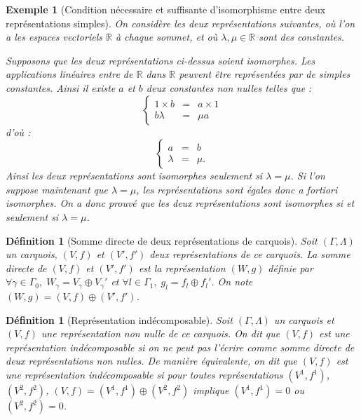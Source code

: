 \documentclass[a4paper,11pt]{article}
\newtheorem{defi}[thm]{Définition}%
\newtheorem{ex}[thm]{Exemple}%
\begin{document}
\begin{ex}[Condition nécessaire et suffisante d'isomorphisme entre deux représentations simples] On considère les deux représentations suivantes, où l'on a les espaces vectoriels $\mathbb R$ à chaque sommet, et où $\lambda,\mu\in\mathbb R$ sont des constantes. 
\label{cnsiso}

\begin{center}
	\end{center}
Supposons que les deux représentations ci-dessus soient isomorphes. Les applications linéaires entre de $\mathbb R$ dans $\mathbb R$ peuvent être représentées par de simples constantes. Ainsi il existe $a$ et $b$ deux constantes non nulles telles que :
\[
\left\{
\begin{array}{ccc}
	1\times b&=&a\times1\\
	b\lambda&=&\mu a 
\end{array}
\right.
\]
d'où :
\[
\left\{
\begin{array}{ccc}
	a&=&b\\
	\lambda&=&\mu. 
\end{array}
\right.
\]
Ainsi les deux représentations sont isomorphes seulement si $\lambda=\mu$. Si l'on suppose maintenant que $\lambda=\mu$, les représentations sont égales donc a fortiori isomorphes. On a donc prouvé que les deux représentations sont isomorphes si et seulement si $\lambda=\mu$.
\end{ex}
\begin{defi}[Somme directe de deux représentations de carquois]
	Soit $(\Gamma,\Lambda)$ un carquois, $(V,f)$ et $(V',f')$ deux représentations de ce carquois. La \emph{somme directe} de $(V,f)$ et $(V',f')$ est la représentation $(W,g)$ définie par $\forall\gamma\in\Gamma_{0},\;W_{\gamma}=V_{\gamma}\oplus V_{\gamma}'$ et $\forall l \in\Gamma_{1},\;g_{l}=f_{l}\oplus f_{l}'$. On note $(W,g)=(V,f)\oplus (V',f')$.
\end{defi}
\begin{defi}[Représentation indécomposable]
	Soit $(\Gamma,\Lambda)$ un carquois et $(V,f)$ une représentation non nulle de ce carquois. On dit que $(V,f)$ est une \emph{représentation indécomposable} si on ne peut pas l'écrire comme somme directe de deux représentations non nulles. De manière équivalente, on dit que $(V,f)$ est une représentation indécomposable si pour toutes représentations $(V^{1},f^{1})$, $(V^{2},f^{2})$, $(V,f)=(V^{1},f^{1})\oplus(V^{2},f^{2})$ implique $(V^{1},f^{1})=0$ ou $(V^{2},f^{2})=0$.
\end{defi}
\end{document}
